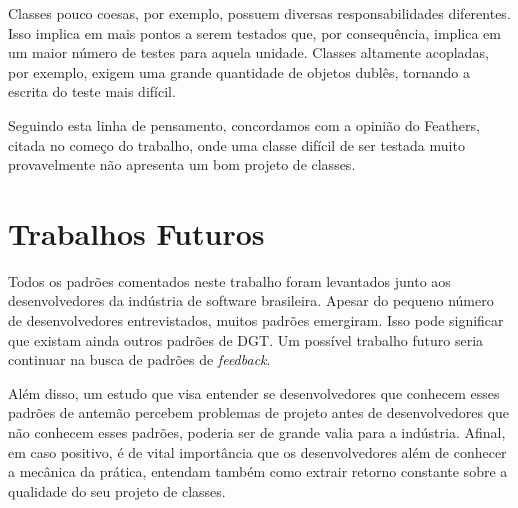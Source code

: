 Classes pouco coesas, por exemplo, possuem diversas responsabilidades diferentes.
Isso implica em mais pontos a serem testados que, por consequência, implica
em um maior número de testes para aquela unidade. Classes altamente acopladas,
por exemplo, exigem uma grande quantidade de objetos dublês, tornando a escrita
do teste mais difícil.

Seguindo esta linha de pensamento, concordamos com a opinião do Feathers,
citada no começo do trabalho, onde uma classe difícil de ser testada muito provavelmente
não apresenta um bom projeto de classes.

\section{Trabalhos Futuros}

Todos os padrões comentados neste trabalho foram levantados junto aos 
desenvolvedores da indústria de software brasileira. Apesar do pequeno
número de desenvolvedores entrevistados, muitos padrões emergiram. Isso
pode significar que existam ainda outros padrões de DGT. Um possível trabalho
futuro seria continuar na busca de padrões de \textit{feedback}.

Além disso, um estudo que visa entender se desenvolvedores que conhecem
esses padrões de antemão percebem problemas de projeto antes de desenvolvedores
que não conhecem esses padrões, poderia ser de grande valia para a indústria.
Afinal, em caso positivo, é de vital importância que os desenvolvedores além
de conhecer a mecânica da prática, entendam também como extrair retorno constante
sobre a qualidade do seu projeto de classes.

